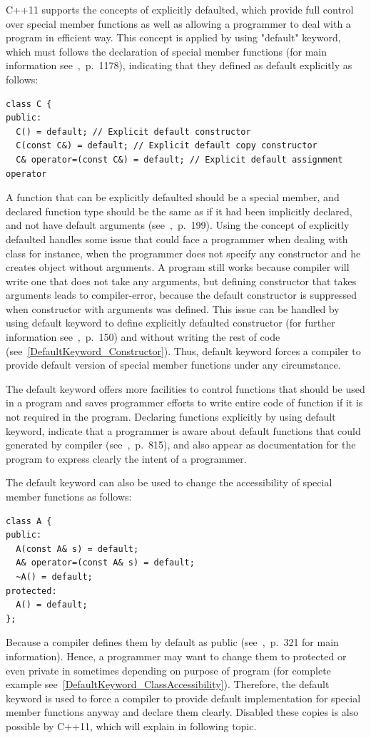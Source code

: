 \documentclass[11pt]{report}
\begin{document}
C++11 supports the concepts of explicitly defaulted, which provide full control over special member functions as well as allowing a programmer to deal with a program in efficient way. This concept is applied by using "default" keyword, which must follows the declaration of special member functions (for main information see~\cite{Prata:2012:Cpp},~p.~1178), indicating that they defined as default explicitly as follows:
\begin{lstlisting}
class C {
public:
  C() = default; // Explicit default constructor
  C(const C&) = default; // Explicit default copy constructor
  C& operator=(const C&) = default; // Explicit default assignment operator
\end{lstlisting}
A function that can be explicitly defaulted should be a special member, and declared function type should be the same as if it had been implicitly declared, and not have default arguments (see~\cite{ISO:2011:Cpplanguage},~p.~199). Using the concept of explicitly defaulted handles some issue that could face a programmer when dealing with class for instance, when the programmer does not specify any constructor and he creates object without arguments. A program still works because compiler will write one that does not take any arguments, but defining constructor that takes arguments leads to compiler-error, because the default constructor is suppressed when constructor with arguments was defined. This issue can be handled by using default keyword to define explicitly defaulted constructor (for further information see~\cite{Gregorie:professionalcpp},~p.~150) and without writing the rest of code (see~\ref{DefaultKeyword_Constructor}). Thus, default keyword forces a compiler to provide default version of special member functions under any circumstance.

The default keyword offers more facilities to control functions that should be used in a program and saves programmer efforts to write entire code of function if it is not required in the program. Declaring functions explicitly by using default keyword, indicate that a programmer is aware about default functions that could generated by compiler (see~\cite{Horstmann:2008:BC},~p.~815), and also appear as documentation for the program to express clearly the intent of a programmer.

The default keyword can also be used to change the accessibility of special member functions as follows:
\begin{lstlisting}
class A {
public:
  A(const A& s) = default;
  A& operator=(const A& s) = default;
  ~A() = default;
protected:
  A() = default;
};\end{lstlisting}
Because a compiler defines them by default as public (see~\cite{Williams:2012:CCA},~p.~321 for main information). Hence, a programmer may want to change them to protected or even private in sometimes depending on purpose of program (for complete example see~\ref{DefaultKeyword_ClassAccessibility}). Therefore, the default keyword is used to force a compiler to provide default implementation for special member functions anyway and declare them clearly. Disabled these copies is also possible by C++11, which will explain in following topic.
\end{document}
